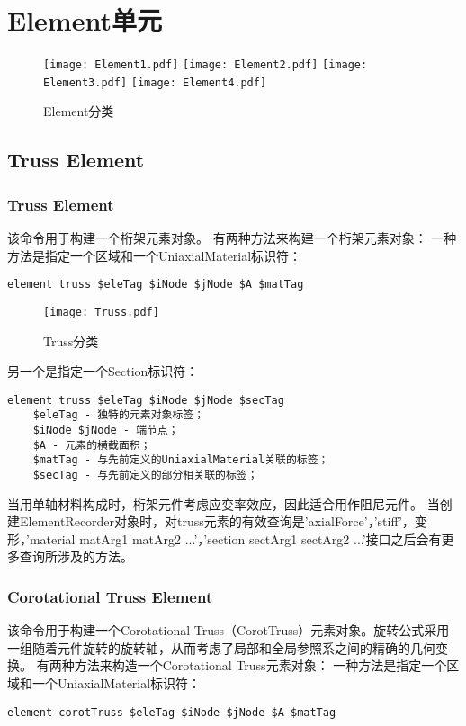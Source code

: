 \documentclass[lang=cn]{elegantpaper}
\begin{document}
\section{Element单元}

\begin{figure}[H]		
	\centering
	\texttt{[image: Element1.pdf]}
	\texttt{[image: Element2.pdf]}
	\texttt{[image: Element3.pdf]}
	\texttt{[image: Element4.pdf]}
	\caption{Element分类}
	\label{tu7}
\end{figure}

\subsection{Truss Element} 
\subsubsection{Truss Element}
该命令用于构建一个桁架元素对象。 有两种方法来构建一个桁架元素对象：
一种方法是指定一个区域和一个UniaxialMaterial标识符：
\begin{lstlisting}
element truss $eleTag $iNode $jNode $A $matTag
\end{lstlisting}

\begin{figure}[H]		
	\centering
	\texttt{[image: Truss.pdf]}
	\caption{Truss分类}
	\label{tu8}
\end{figure}

另一个是指定一个Section标识符：
\begin{lstlisting}
element truss $eleTag $iNode $jNode $secTag
	$eleTag - 独特的元素对象标签；
	$iNode $jNode - 端节点；
	$A - 元素的横截面积；
	$matTag - 与先前定义的UniaxialMaterial关联的标签；
	$secTag - 与先前定义的部分相关联的标签；
\end{lstlisting}
当用单轴材料构成时，桁架元件考虑应变率效应，因此适合用作阻尼元件。
当创建ElementRecorder对象时，对truss元素的有效查询是'axialForce'，'stiff'，变形，'material matArg1 matArg2 ...'，'section sectArg1 sectArg2 ...'接口之后会有更多查询所涉及的方法。

\subsubsection{Corotational Truss Element}
该命令用于构建一个Corotational Truss（CorotTruss）元素对象。旋转公式采用一组随着元件旋转的旋转轴，从而考虑了局部和全局参照系之间的精确的几何变换。
有两种方法来构造一个Corotational Truss元素对象：
一种方法是指定一个区域和一个UniaxialMaterial标识符：
\begin{lstlisting}
element corotTruss $eleTag $iNode $jNode $A $matTag
\end{lstlisting}
\end{document}

